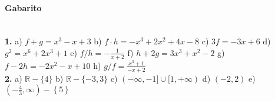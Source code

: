 \documentclass[a4paper,12pt]{article}
\begin{document}
\vspace*{\fill}
{\footnotesize
\paragraph*{Gabarito} \hspace*{\fill}\\
\textbf{1.}  a) $f + g = x^3 - x + 3$
 b) $f \cdot h = -x^3  + 2x^2 + 4x - 8$ 
 c) $3f = -3x + 6$ 
 d) $g^2 = x^6 + 2x^3 + 1$ 
 e) $f/h = -\frac{1}{x + 2}$ 
 f) $h + 2g = 3x^3 + x^2 - 2$ 
 g) $f - 2h = -2x^2 -x+ 10$ 
 h) $g/f = \frac{x^3 + 1}{-x + 2}$\\
\textbf{2.} a) $\mathbb{R} - \{4\}$ 
 b) $\mathbb{R} - \{-3, 3\}$ 
 c) $(-\infty, -1]\cup[1,+\infty)$ 
 d) $(-2, 2)$ 
 e) $\left(-\frac{4}{3},\infty\right) - \left\{ 5 \right\}$ 
}
\end{document}
